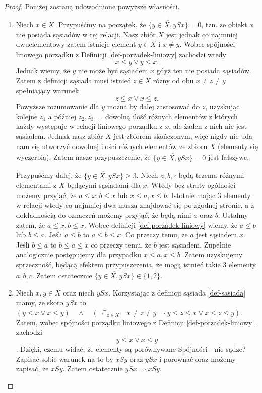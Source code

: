 \documentclass[12pt,a4paper]{report}
\newcommand{\licznosc}[1]{\overline{\overline{#1}}}
\begin{document}
\begin{proof}
Poniżej zostaną udowodnione powyższe własności.
\begin{enumerate}
\item Niech $x \in X$. Przypuśćmy na początek, że $\licznosc{\{y \in X, ySx\}} = 0$, tzn. że obiekt $x$ nie posiada sąsiadów w tej relacji. Nasz zbiór $X$ jest jednak co najmniej dwuelementowy zatem istnieje element $y \in X$ i $ x \neq y$. Wobec spójności linowego porządku z Definicji \ref{def-porzadek-liniowy} zachodzi wtedy
$$ x \leq y \lor y \leq x.$$
Jednak wiemy, że $y$ nie może być sąsiadem $x$ gdyż ten nie posiada sąsiadów. Zatem z definicji sąsiada musi istnieć $z \in X$ różny od obu $x \neq z \neq y$ spełniający warunek
$$
z \leq x \lor x \leq z.
$$
Powyższe rozumowanie dla $y$ można by dalej zastosować do $z$, uzyskując kolejne $z_1$ a później $z_2,z_3, \ldots$ dowolną ilość różnych elementów z których każdy występuje w relacji liniowego porządku z $x$, ale żaden z nich nie jest sąsiadem. Jednak nasz zbiór $X$ jest zbiorem skończonym, więc nigdy nie uda nam się utworzyć dowolnej ilości różnych elementów ze zbioru $X$ (elementy się wyczerpią). Zatem nasze przypuszczenie, że $\licznosc{\{y \in X, ySx\}} = 0$ jest fałszywe.

Przypuśćmy dalej, że $\licznosc{\{y \in X, ySx\}} \geq 3$. Niech $a,b,c$ będą trzema różnymi elementami z $X$ będącymi sąsiadami dla $x$. Wtedy bez straty ogólności możemy przyjąć, że $a \leq x, b \leq x$ lub $x \leq a, x \leq b$. Istotnie mając 3 elementy w relacji wtedy co najmniej dwa muszą znajdować się po zgodnej stronie, a z dokładnością do oznaczeń możemy przyjąć, że będą nimi $a$ oraz $b$. Ustalmy zatem, że $a \leq x, b \leq x$. Wobec definicji \ref{def-porzadek-liniowy} wiemy, że $a \leq b$ lub $b \leq a$. Jeśli $a \leq b$ to $a \leq b \leq x$. Co przeczy temu, że $a$ jest sąsiadem $x$. Jeśli $b \leq a$ to $b \leq a \leq x$ co przeczy temu, że $b$ jest sąsiadem. Zupełnie analogicznie postępujemy dla przypadku $x \leq a, x \leq b$. Zatem uzyskujemy sprzeczność, będącą efektem przypuszczenia, że mogą istnieć takie 3 elementy $a,b,c$. Zatem ostatecznie $\licznosc{\{y \in X, ySx\}} \in \{ 1,2 \}$.

\item Niech $x,y \in X$ oraz niech $ySx$. Korzystając z definicji sąsiada \ref{def-sasiada} mamy, że skoro $ySx$ to  $\left(y \leq x \lor x\leq y \right)\quad \land \quad  \left(\lnot \exists_{z \in X}  \quad x\neq z \neq y \Rightarrow   y \leq z \leq x \lor x \leq z \leq y \right)$.{\color{blue} Zatem, wobec spójności porządku liniowego z Definicji \ref{def-porzadek-liniowy}, zachodzi $$ y\leq x \lor x\leq y$$. Dzięki, czemu widać, że elementy są porównywane \color{red} Spójności - nie sądze? Zapisać sobie warunek na to by $xSy$ oraz $ySx$ i porównać} oraz możemy zapisać, że $xSy$. Zatem ostatecznie $ySx \Rightarrow xSy$.


\end{enumerate}
\end{proof}
\end{document}
